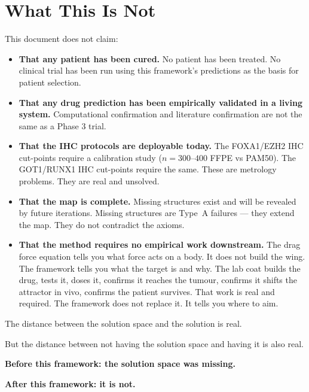 \documentclass[11pt, a4paper]{article}
\begin{document}
\section{What This Is Not}

\begin{mdframed}[backgroundcolor=notbox,
                 linecolor=red!40!black,
                 linewidth=1pt]
This document does not claim:

\begin{itemize}
    \item \textbf{That any patient has been cured.}
    No patient has been treated. No clinical trial has
    been run using this framework's predictions as the
    basis for patient selection.

    \item \textbf{That any drug prediction has been
    empirically validated in a living system.}
    Computational confirmation and literature confirmation
    are not the same as a Phase 3 trial.

    \item \textbf{That the IHC protocols are deployable
    today.}
    The FOXA1/EZH2 IHC cut-points require a calibration
    study ($n=300$--$400$ FFPE vs PAM50). The GOT1/RUNX1
    IHC cut-points require the same. These are metrology
    problems. They are real and unsolved.

    \item \textbf{That the map is complete.}
    Missing structures exist and will be revealed by future
    iterations. Missing structures are Type~A failures ---
    they extend the map. They do not contradict the axioms.

    \item \textbf{That the method requires no empirical
    work downstream.}
    The drag force equation tells you what force acts on
    a body. It does not build the wing. The framework
    tells you what the target is and why. The lab coat
    builds the drug, tests it, doses it, confirms it
    reaches the tumour, confirms it shifts the attractor
    in vivo, confirms the patient survives. That work is
    real and required. The framework does not replace it.
    It tells you where to aim.
\end{itemize}

\medskip
The distance between the solution space and the solution
is real.

But the distance between not having the solution space
and having it is also real.

\textbf{Before this framework: the solution space was
missing.}

\textbf{After this framework: it is not.}
\end{mdframed}
\end{document}
